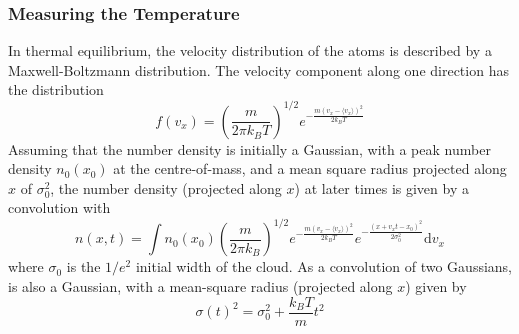 \subsubsection{Measuring the Temperature}
In thermal equilibrium, the velocity distribution of the atoms is
described by a Maxwell-Boltzmann distribution. The velocity
component along one direction has the distribution
\begin{equation}
  f(v_x) = \left(\frac{m}{2\pi k_B T}\right)^{1/2}e^{-\frac{m (v_x-\langle v_x \rangle) ^2}{2 k_B T}}
  \label{eq:mb1D}
\end{equation}
Assuming that the number density is initially a Gaussian, with a peak
number density \(n_0(x_0)\) at the centre-of-mass,
and a mean square radius projected along $x$ of $\sigma_0^2$, the
number density (projected along $x$)
at later times is given by a convolution with~
\begin{equation}
  n(x,t) = \int n_0(x_0) \left(\frac{m}{2\pi k_B}\right)^{1/2} e^{-\frac{m (v_x-\langle v_x \rangle)^2}{2 k_B T}} e^{-\frac{(x+v_x t - x_0)^2}{2\sigma_0^2}} \mathrm{d}v_x
  \label{eq:density_time}
\end{equation}
where \(\sigma_0\) is the \(1/e^2\) initial width of the cloud. As a
convolution of two Gaussians,  is also a
Gaussian, with a mean-square radius (projected along $x$) given by
\begin{equation}
  \sigma(t)^2 = \sigma_0^2 + \frac{k_B T}{m} t^2
  \label{eq:expansion_width}
\end{equation}
